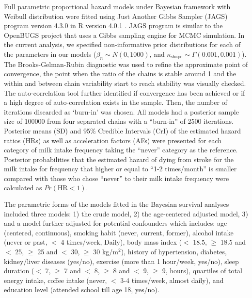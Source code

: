 \documentclass[nutrients,article,submitted,moreauthors,pdftex]{Definitions/mdpi}
\begin{document}
Full parametric proportional hazard models under Bayesian framework with
Weibull distribution were fitted using Just Another Gibbs Sampler (JAGS)
program \citep{Plummer2003} version 4.3.0 in R version 4.0.1
\citep{RCT2020}. JAGS program is similar to the OpenBUGS
\citep{Lunn2009} project that uses a Gibbs sampling engine for MCMC
simulation. In the current analysis, we specified non-informative prior
distributions for each of the parameters in our models
(\(\beta_n \sim N(0, 1000)\), and
\(\kappa_{\text{shape}} \sim \Gamma(0.001, 0.001)\)). The
Brooks-Gelman-Rubin diagnostic \citep{Brooks1998} was used to refine the
approximate point of convergence, the point when the ratio of the chains
is stable around 1 and the within and between chain variability start to
reach stability was visually checked. The auto-correlation tool further
identified if convergence has been achieved or if a high degree of
auto-correlation exists in the sample. Then, the number of iterations
discarded as `burn-in' was chosen. All models had a posterior sample
size of 100000 from four separated chains with a ``burn-in'' of 2500
iterations. Posterior means (SD) and 95\% Credible Intervals (CrI) of
the estimated hazard ratios (HRs) as well as acceleration factors (AFs)
were presented for each category of milk intake frequency taking the
``never'' category as the reference. Posterior probabilities that the
estimated hazard of dying from stroke for the milk intake for frequency
that higher or equal to ``1-2 times/month'' is smaller compared with
those who chose ``never'' to their milk intake frequency were calculated
as \(Pr(\text{HR} < 1)\).

The parametric forms of the models fitted in the Bayesian survival
analyses included three models: 1) the crude model, 2) the age-centered
adjusted model, 3) and a model further adjusted for potential
confounders which includes: age (centered, continuous), smoking habit
(never, current, former), alcohol intake (never or past, \(<\) 4
times/week, Daily), body mass index (\(<\) 18.5, \(\geq\) 18.5 and \(<\)
25, \(\geq\) 25 and \(<\) 30, \(\geq\) 30 kg/m\(^2\)), history of
hypertension, diabetes, kidney/liver diseases (yes/no), exercise (more
than 1 hour/week, yes/no), sleep duration (\(<\) 7, \(\geq\) 7 and \(<\)
8, \(\geq\) 8 and \(<\) 9, \(\geq\) 9, hours), quartiles of total energy
intake, coffee intake (never, \(<\) 3-4 times/week, almost daily), and
education level (attended school till age 18, yes/no).
\end{document}
